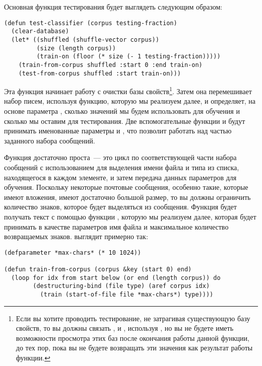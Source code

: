 Основная функция тестирования будет выглядеть следующим образом:

\begin{lstlisting}
(defun test-classifier (corpus testing-fraction)
  (clear-database)
  (let* ((shuffled (shuffle-vector corpus))
         (size (length corpus))
         (train-on (floor (* size (- 1 testing-fraction)))))
    (train-from-corpus shuffled :start 0 :end train-on)
    (test-from-corpus shuffled :start train-on)))
\end{lstlisting}

Эта функция начинает работу с очистки базы свойств\footnote{Если вы хотите проводить
  тестирование, не затрагивая существующую базу свойств, то вы должны связать
  ,  и , используя
  , но вы не будете иметь возможности просмотра этих баз после окончания работы
  данной функции, до тех пор, пока вы не будете возвращать эти значения как результат
  работы функции.}. Затем она перемешивает набор писем, используя функцию, которую мы
реализуем далее, и определяет, на основе параметра , сколько
значений мы будем использовать для обучения и сколько мы оставим для тестирования.  Две
вспомогательные функции  и  будут
принимать именованные параметры  и , что позволит работать над
частью заданного набора сообщений.

Функция  достаточно проста~--- это цикл по соответствующей части
набора сообщений с использованием  для выделения имени файла и
типа из списка, находящегося в каждом элементе, и затем передача данных параметров для
обучения.  Поскольку некоторые почтовые сообщения, особенно такие, которые имеют вложения,
имеют достаточно большой размер, то вы должны ограничить количество знаков, которое будет
выделяться из сообщения.  Функция будет получать текст с помощью функции
, которую мы реализуем далее, которая будет принимать в качестве
параметров имя файла и максимальное количество возвращаемых знаков.
 выглядит примерно так:

\begin{lstlisting}
(defparameter *max-chars* (* 10 1024))

(defun train-from-corpus (corpus &key (start 0) end)
  (loop for idx from start below (or end (length corpus)) do
        (destructuring-bind (file type) (aref corpus idx)
          (train (start-of-file file *max-chars*) type))))
\end{lstlisting}

